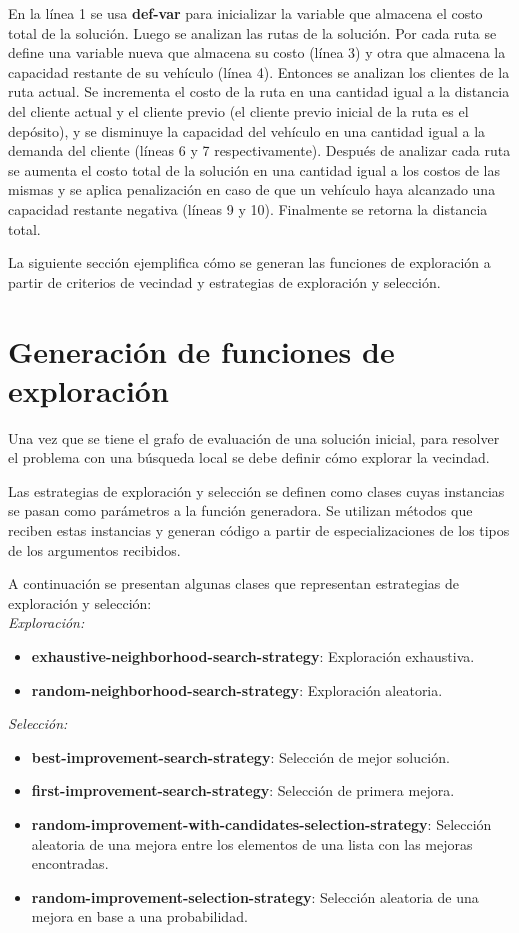 En la línea 1 se usa \textbf{def-var} para inicializar la variable que almacena el costo total de la solución. Luego se analizan las rutas de la solución. Por cada ruta se define una variable nueva que almacena su costo (línea 3) y otra que almacena la capacidad restante de su vehículo (línea 4). Entonces se analizan los clientes de la ruta actual. Se incrementa el costo de la ruta en una cantidad igual a la distancia del cliente actual y el cliente previo (el cliente previo inicial de la ruta es el depósito), y se disminuye la capacidad del vehículo en una cantidad igual a la demanda del cliente (líneas 6 y 7 respectivamente). Después de analizar cada ruta se aumenta el costo total de la solución en una cantidad igual a los costos de las mismas y se aplica penalización en caso de que un vehículo haya alcanzado una capacidad restante negativa (líneas 9 y 10). Finalmente se retorna la distancia total.

La siguiente sección ejemplifica cómo se generan las funciones de exploración a partir de criterios de vecindad y estrategias de exploración y selección.

\section{Generación de funciones de exploración}\label{4-generator}

Una vez que se tiene el grafo de evaluación de una solución inicial, para resolver el problema con una búsqueda local se debe definir cómo explorar la vecindad.

Las estrategias de exploración y selección se definen como clases cuyas instancias se pasan como parámetros a la función generadora. Se utilizan métodos que reciben estas instancias y generan código a partir de especializaciones de los tipos de los argumentos recibidos.

A continuación se presentan algunas clases que representan estrategias de exploración y selección:\\

\textit{Exploración:}
\begin{itemize}
	\item \textbf{exhaustive-neighborhood-search-strategy}: Exploración exhaustiva.
	\item \textbf{random-neighborhood-search-strategy}: Exploración aleatoria.
\end{itemize}

\textit{Selección:}
\begin{itemize}
	\item \textbf{best-improvement-search-strategy}: Selección de mejor solución.
	\item \textbf{first-improvement-search-strategy}: Selección de primera mejora.
	\item \textbf{random-improvement-with-candidates-selection-strategy}: Selección aleatoria de una mejora entre los elementos de una lista con las mejoras encontradas.
	\item \textbf{random-improvement-selection-strategy}: Selección aleatoria de una mejora en base a una probabilidad.
\end{itemize}

